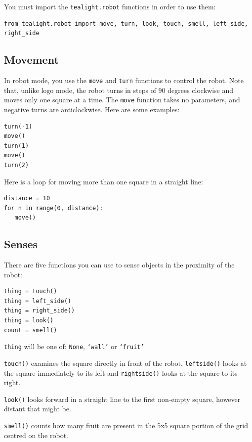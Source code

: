 \documentclass[12pt,a4paper,twoside]{article}
\renewcommand{\_}{\texttt{\symbol{95}}}
\begin{document}
You must import the \verb^tealight.robot^ functions in order to use them:

\begin{verbatim}
from tealight.robot import move, turn, look, touch, smell, left_side, right_side
\end{verbatim}

\subsection{Movement}

In robot mode, you use the \verb^move^ and \verb^turn^
functions to control the robot. Note that, unlike logo mode, the robot turns in steps of 90 degrees clockwise and moves only one square at a time. The \verb^move^ function takes no parameters, and negative turns are anticlockwise. Here are some examples:

\begin{verbatim}
turn(-1)
move()
turn(1)
move()
turn(2)
\end{verbatim}


Here is a loop for moving more than one square
in a straight line:

\begin{verbatim}
distance = 10
for n in range(0, distance):
   move()

\end{verbatim}

\subsection{Senses}

There are five functions you can use to sense objects in the proximity
of the robot:

\begin{verbatim}
thing = touch()
thing = left_side()
thing = right_side()
thing = look()
count = smell()
\end{verbatim}

\begin{bulletlist}
\item \texttt{thing} will be one of:
	\texttt{None}, \texttt{`wall'} or \texttt{`fruit'}

\item \texttt{touch()} examines the square directly in front of the
	robot, \texttt{left\_side()} looks at the square immediately to its
	left and \texttt{right\_side()} looks at the square to its right.

\item \texttt{look()} looks forward in a straight line to the first
	non-empty square, however distant that might be.

\item \texttt{smell()} counts how many fruit are present
	in the 5x5 square portion of the grid centred on the robot.
\end{bulletlist}
\end{document}
